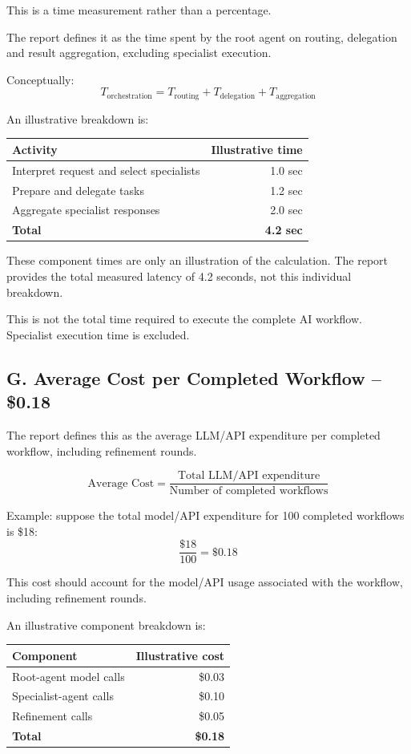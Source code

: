 \documentclass[11pt,a4paper]{article}
\begin{document}
This is a time measurement rather than a percentage.

The report defines it as the time spent by the root agent on routing, delegation and result aggregation, excluding specialist execution.

Conceptually:
\[
T_{\text{orchestration}} =
T_{\text{routing}}+T_{\text{delegation}}+T_{\text{aggregation}}
\]

An illustrative breakdown is:

\begin{center}
\begin{tabular}{lr}
\toprule
\textbf{Activity} & \textbf{Illustrative time}\\
\midrule
Interpret request and select specialists & 1.0 sec\\
Prepare and delegate tasks & 1.2 sec\\
Aggregate specialist responses & 2.0 sec\\
\midrule
\textbf{Total} & \textbf{4.2 sec}\\
\bottomrule
\end{tabular}
\end{center}

These component times are only an illustration of the calculation. The report provides the total measured latency of 4.2 seconds, not this individual breakdown.

This is not the total time required to execute the complete AI workflow. Specialist execution time is excluded.

\subsection{G. Average Cost per Completed Workflow -- \$0.18}

The report defines this as the average LLM/API expenditure per completed workflow, including refinement rounds.

\[
\text{Average Cost} =
\frac{\text{Total LLM/API expenditure}}
     {\text{Number of completed workflows}}
\]

Example: suppose the total model/API expenditure for 100 completed workflows is \$18:
\[
\frac{\$18}{100}=\boxed{\$0.18}
\]

This cost should account for the model/API usage associated with the workflow, including refinement rounds.

An illustrative component breakdown is:

\begin{center}
\begin{tabular}{lr}
\toprule
\textbf{Component} & \textbf{Illustrative cost}\\
\midrule
Root-agent model calls & \$0.03\\
Specialist-agent calls & \$0.10\\
Refinement calls & \$0.05\\
\midrule
\textbf{Total} & \textbf{\$0.18}\\
\bottomrule
\end{tabular}
\end{center}
\end{document}
